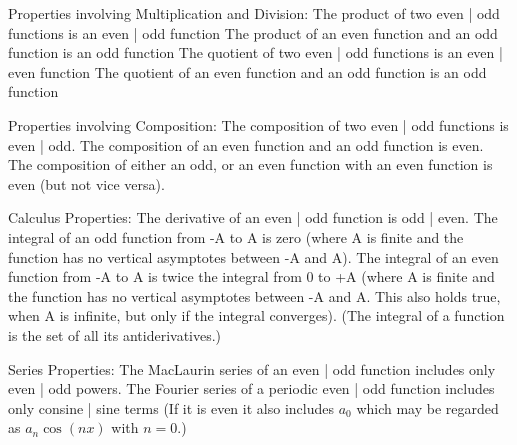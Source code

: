 \documentclass[12pt]{article}
\begin{document}
\begin{flushleft}
	Properties involving Multiplication and Division: \linebreak 
	\textbullet \quad The product of two even | odd functions is an even | odd function \linebreak 
	\textbullet \quad The product of an even function and an odd function is an odd function \linebreak 
	\textbullet \quad The quotient of two even | odd functions is an even | even function \linebreak 
	\textbullet \quad The quotient of an even function and an odd function is an odd function \linebreak 
	
	Properties involving Composition: \linebreak 
	\textbullet \quad The composition of two even | odd functions is even | odd. \linebreak 
	\textbullet \quad The composition of an even function and an odd function is even. \linebreak 
	\textbullet \quad The composition of either an odd, or an even function with an even function is even (but not vice versa). \linebreak 
	
	Calculus Properties: \linebreak 
	\textbullet \quad The derivative of an even | odd function is odd | even. \linebreak 
	\textbullet \quad The integral of an odd function from -A to A is zero (where A is finite and the function has no vertical asymptotes between -A and A). \linebreak 
	\textbullet \quad The integral of an even function from -A to A is twice the integral from 0 to +A (where A is finite and the function has no vertical asymptotes between -A and A. This also holds true, when A is infinite, but only if the integral converges). \linebreak 
	(The integral of a function is the set of all its antiderivatives.) \linebreak 
	
	Series Properties: \linebreak 
	\textbullet \quad The MacLaurin series of an even | odd function includes only even | odd powers. \linebreak 
	\textbullet \quad The Fourier series of a periodic even | odd function includes only consine | sine terms (If it is even it also includes $a_0$ which may be regarded as $a_n\cos (nx)$ with $n=0$.) \linebreak 
	

\end{flushleft}
\end{document}
